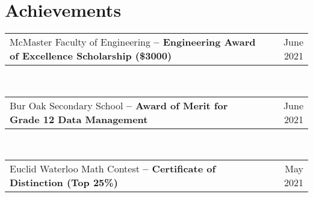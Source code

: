 \documentclass[letterpaper,11pt]{article}
\makeatletter
\newcommand{\resumeDatedList}[2]{
    \vspace{-2pt}\item
    \begin{tabular*}{0.97\textwidth}[t]{l@{\extracolsep{\fill}}r}
        #1 & #2 \\
    \end{tabular*}
}
\newcommand{\resumeListStart}{\begin{itemize}[itemindent=-0.33in,leftmargin=0.48in, label={}]}
\newcommand{\resumeListEnd}{\end{itemize}}
\makeatother
\begin{document}
%
\section{Achievements}
\resumeListStart\small{
	\resumeDatedList{McMaster Faculty of Engineering \textbf{-- Engineering Award of Excellence Scholarship (\$3000)}}{June 2021} \\
	\resumeDatedList{Bur Oak Secondary School \textbf{-- Award of Merit for Grade 12 Data Management}}{June 2021} \\
	\resumeDatedList{Euclid Waterloo Math Contest \textbf{-- Certificate of Distinction (Top 25\%)}}{May 2021} \\
} \resumeListEnd

\end{document}
